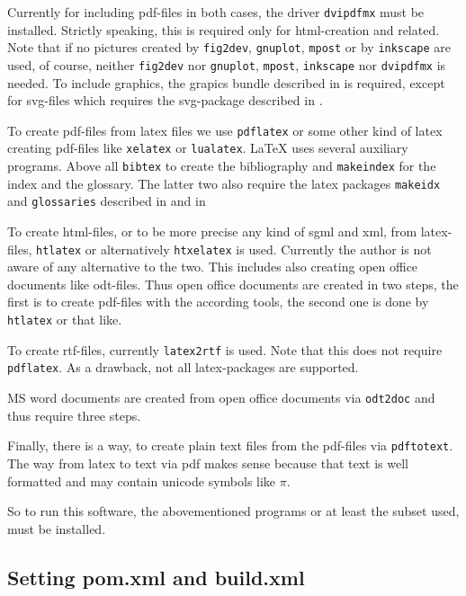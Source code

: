 \documentclass[12pt]{article}
\begin{document}
Currently for including pdf-files in both cases, 
the driver {\tt dvipdfmx} must be installed. 
Strictly speaking, this is required only for html-creation and related. 
Note that if no pictures created by {\tt fig2dev}, {\tt gnuplot}, 
{\tt mpost} or by {\tt inkscape} are used, of course, 
neither {\tt fig2dev} nor {\tt gnuplot}, {\tt mpost}, {\tt inkscape} 
nor {\tt dvipdfmx} is needed. 
To include graphics, the grapics bundle described in \cite{GraX} is required, 
except for svg-files which requires the svg-package 
described in \cite{SvgP}. 

To create pdf-files from latex files we use {\tt pdflatex} 
or some other kind of latex creating pdf-files 
like {\tt xelatex} or {\tt lualatex}. 
LaTeX uses several auxiliary programs. 
Above all {\tt bibtex} to create the bibliography 
and {\tt makeindex} for the index and the glossary. 
The latter two 
also require the latex packages {\tt makeidx} and {\tt glossaries} 
described in \cite{MkidxShIdxP} and in 


To create \gls{html}-files, 
or to be more precise any kind of \gls{sgml} and \gls{xml}, 
from latex-files, {\tt htlatex} or alternatively {\tt htxelatex} is used. 
Currently the author is not aware of any alternative to the two. 
This includes also creating open office documents like odt-files. 
Thus open office documents are created in two steps, 
the first is to create pdf-files with the according tools, 
the second one is done by {\tt htlatex} or that like. 

To create rtf-files, currently {\tt latex2rtf} is used. 
Note that this does not require {\tt pdflatex}. 
As a drawback, not all latex-packages are supported. 

MS word documents are created from open office documents via {\tt odt2doc} 
and thus require three steps. 

Finally, there is a way, to create plain text files from the pdf-files 
via {\tt pdftotext}. 
The way from latex to text via pdf makes sense 
because that text is well formatted 
and may contain unicode symbols like $\pi$. 

So to run this software, the abovementioned programs 
or at least the subset used, must be installed. 

\subsection{Setting pom.xml and build.xml}\label{subsec:sgml}
\end{document}
